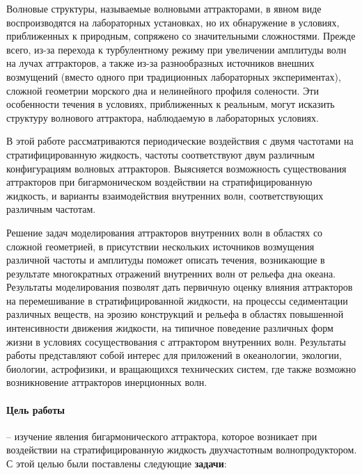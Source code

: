 \documentclass[utf8x]{G7-32} %
\begin{document}
Волновые структуры, называемые волновыми аттракторами, в явном виде воспроизводятся на лабораторных установках, но их обнаружение в условиях, приближенных к природным, сопряжено со значительными сложностями. Прежде всего, из-за перехода к турбулентному режиму при увеличении амплитуды волн на лучах аттракторов, а также из-за разнообразных источников внешних возмущений (вместо одного при традиционных лабораторных экспериментах), сложной геометрии морского дна и нелинейного профиля солености. Эти особенности течения в условиях, приближенных к реальным, могут исказить структуру волнового аттрактора, наблюдаемую в лабораторных условиях. 

В этой работе рассматриваются периодические воздействия с двумя частотами на стратифицированную жидкость, частоты соответствуют двум различным конфигурациям волновых аттракторов. Выясняется возможность существования аттракторов при бигармоническом воздействии на стратифицированную жидкость, и варианты взаимодействия внутренних волн, соответствующих различным частотам. 

Решение задач моделирования аттракторов внутренних волн в областях со сложной геометрией, в присутствии нескольких источников возмущения различной частоты и амплитуды поможет описать течения, возникающие в результате многократных отражений внутренних волн от рельефа дна океана. Результаты моделирования позволят дать первичную оценку влияния аттракторов на перемешивание в стратифицированной жидкости, на процессы седиментации различных веществ, на эрозию конструкций и рельефа в областях повышенной интенсивности движения жидкости, на типичное поведение различных форм жизни в условиях сосуществования с аттрактором внутренних волн. Результаты работы представляют собой интерес для приложений в океанологии, экологии, биологии, астрофизики, и вращающихся технических систем, где также возможно возникновение аттракторов инерционных волн. 

\paragraph{Цель работы} -- изучение явления бигармонического аттрактора, которое возникает при воздействии на стратифицированную жидкость двухчастотным волнопродуктором.  
С этой целью были поставлены следующие \textbf{задачи}:
\end{document}
